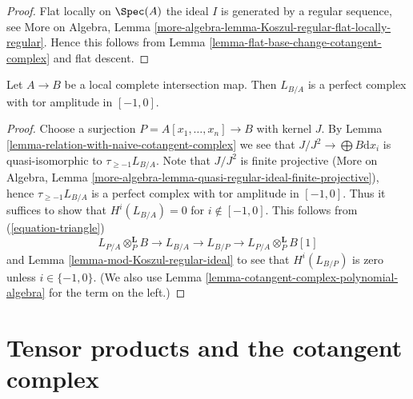 \begin{proof}
Flat locally on $\Spec(A)$ the ideal $I$ is generated by a regular
sequence, see More on Algebra, Lemma
\ref{more-algebra-lemma-Koszul-regular-flat-locally-regular}.
Hence this follows from
Lemma \ref{lemma-flat-base-change-cotangent-complex}
and flat descent.
\end{proof}

\begin{proposition}
\label{proposition-cotangent-complex-local-complete-intersection}
Let $A \to B$ be a local complete intersection map.
Then $L_{B/A}$ is a perfect complex with tor amplitude in $[-1, 0]$.
\end{proposition}

\begin{proof}
Choose a surjection $P = A[x_1, \ldots, x_n] \to B$ with kernel $J$.
By Lemma \ref{lemma-relation-with-naive-cotangent-complex}
we see that $J/J^2 \to \bigoplus B\text{d}x_i$
is quasi-isomorphic to $\tau_{\geq -1}L_{B/A}$.
Note that $J/J^2$ is finite projective
(More on Algebra, Lemma
\ref{more-algebra-lemma-quasi-regular-ideal-finite-projective}),
hence $\tau_{\geq -1}L_{B/A}$ is a perfect complex with
tor amplitude in $[-1, 0]$.
Thus it suffices to show that $H^i(L_{B/A}) = 0$ for $i \not \in [-1, 0]$.
This follows from (\ref{equation-triangle})
$$
L_{P/A} \otimes_P^\mathbf{L} B \to L_{B/A} \to L_{B/P} \to
L_{P/A} \otimes_P^\mathbf{L} B[1]
$$
and Lemma \ref{lemma-mod-Koszul-regular-ideal}
to see that $H^i(L_{B/P})$ is zero unless $i \in \{-1, 0\}$.
(We also use Lemma \ref{lemma-cotangent-complex-polynomial-algebra}
for the term on the left.)
\end{proof}








\section{Tensor products and the cotangent complex}
\label{section-tensor-product}

